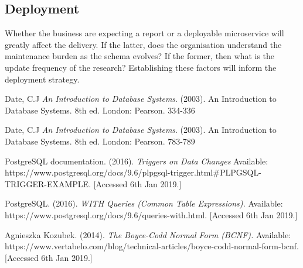 \documentclass[12pt]{article}
\begin{document}
\subsection{Deployment}
Whether the business are expecting a report or a deployable microservice will greatly affect the delivery. If the latter, does the organisation understand the maintenance burden as the schema evolves? If the former, then what is the update frequency of the research? Establishing these factors will inform the deployment strategy.
\begin{thebibliography}{9}

Date, C.J
\textit{An Introduction to Database Systems}.
(2003). An Introduction to Database Systems. 8th ed. London: Pearson. 334-336

Date, C.J
\textit{An Introduction to Database Systems}.
(2003). An Introduction to Database Systems. 8th ed. London: Pearson. 783-789

PostgreSQL documentation. (2016).
\textit{Triggers on Data Changes}
 Available: https://www.postgresql.org/docs/9.6/plpgsql-trigger.html#PLPGSQL-TRIGGER-EXAMPLE. [Accessed 6th Jan 2019.]

PostgreSQL. (2016). \textit{WITH Queries (Common Table Expressions).} Available: https://www.postgresql.org/docs/9.6/queries-with.html. [Accessed 6th Jan 2019.]

Agnieszka Kozubek. (2014). \textit{The Boyce-Codd Normal Form (BCNF).} Available: https://www.vertabelo.com/blog/technical-articles/boyce-codd-normal-form-bcnf. [Accessed 6th Jan 2019.]


\end{thebibliography}

\appendix
\end{document}
